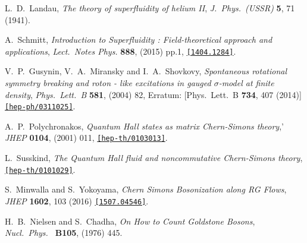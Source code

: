 \begin{thebibliography}{99}
  L.~D.~Landau,
  {\it The theory of superfluidity of helium II},
  {\it J.\ Phys.\ (USSR)} {\bf 5}, 71 (1941).
  
  A.~Schmitt,
  {\it Introduction to Superfluidity : Field-theoretical approach and applications},
   {\it Lect.\ Notes Phys.}  {\bf 888},  (2015) pp.1,
  \href{https://arxiv.org/abs/1404.1284}{\tt[1404.1284]}.
  
  V.~P.~Gusynin, V.~A.~Miransky and I.~A.~Shovkovy,
 {\it Spontaneous rotational symmetry breaking and roton - like excitations in gauged $\sigma$-model at finite density}, 
  {\it Phys.\ Lett.\ B} {\bf 581},  (2004) 82,
  Erratum: [Phys.\ Lett.\ B {\bf 734}, 407 (2014)]
 \href{https://arxiv.org/abs/1404.1284}{\tt[hep-ph/0311025]}.
  
  A.~P.~Polychronakos,
  {\it Quantum Hall states as matrix Chern-Simons theory},'
  {\it JHEP} {\bf 0104}, (2001) 011, 
\href{https://arxiv.org/abs/hep-th/0103013} {\tt[hep-th/0103013]}.
  
  L.~Susskind,
  {\it The Quantum Hall fluid and noncommutative Chern-Simons theory},
  \href{https://arxiv.org/abs/hep-th/0103013} {\tt[hep-th/0101029]}.
  
  S.~Minwalla and S.~Yokoyama,
  {\it Chern Simons Bosonization along RG Flows},
  {\it JHEP} {\bf 1602}, 103 (2016)
 \href{https://arxiv.org/abs/1507.04546} {\tt[1507.04546]}.
  
  H.~B.~Nielsen and S.~Chadha,
  {\it On How to Count Goldstone Bosons},
  {\it Nucl.\ Phys.\ } {\bf B105},  (1976) 445.
  

\end{thebibliography}
